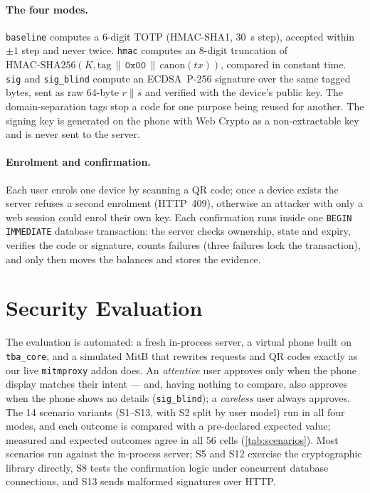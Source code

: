 \paragraph{The four modes.}
\texttt{baseline} computes a 6-digit TOTP (HMAC-SHA1, 30~s step), accepted
within $\pm1$ step and never twice. \texttt{hmac} computes an 8-digit truncation
of $\mathrm{HMAC\text{-}SHA256}(K, \text{tag}\,\|\,\texttt{0x00}\,\|\,\mathrm{canon}(tx))$,
compared in constant time. \texttt{sig} and \texttt{sig\_blind} compute an
ECDSA~P-256 signature over the same tagged bytes, sent as raw 64-byte $r\|s$ and
verified with the device's public key. The domain-separation tags stop a code
for one purpose being reused for another. The signing key is generated on the
phone with Web Crypto as a non-extractable key and is never sent to the server.

\paragraph{Enrolment and confirmation.}
Each user enrols one device by scanning a QR code; once a device exists the
server refuses a second enrolment (HTTP~409), otherwise an attacker with only a
web session could enrol their own key. Each confirmation runs inside one
\texttt{BEGIN IMMEDIATE} database transaction: the server checks ownership,
state and expiry, verifies the code or signature, counts failures (three
failures lock the transaction), and only then moves the balances and stores the
evidence.

\section{Security Evaluation}\label{sec:main-eval}
The evaluation is automated: a fresh in-process server, a virtual phone built
on \texttt{tba\_core}, and a simulated MitB that rewrites requests and QR codes
exactly as our live \texttt{mitmproxy} addon does. An \emph{attentive} user
approves only when the phone display matches their intent --- and, having
nothing to compare, also approves when the phone shows no details
(\texttt{sig\_blind}); a \emph{careless} user always approves. The 14 scenario
variants (S1--S13, with S2 split by user model) run in all four modes, and each
outcome is compared with a pre-declared expected value; measured and expected
outcomes agree in all 56 cells (\cref{tab:scenarios}). Most scenarios run
against the in-process server; S5 and S12 exercise the cryptographic library
directly, S8 tests the confirmation logic under concurrent database
connections, and S13 sends malformed signatures over HTTP.

